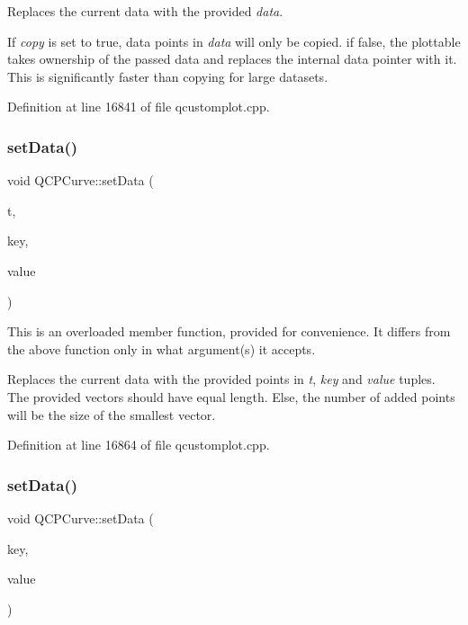 Replaces the current data with the provided {\itshape data}.

If {\itshape copy} is set to true, data points in {\itshape data} will only be copied. if false, the plottable takes ownership of the passed data and replaces the internal data pointer with it. This is significantly faster than copying for large datasets. 

Definition at line 16841 of file qcustomplot.\+cpp.

\mbox{\label{class_q_c_p_curve_affe80e011e2ced62a88f614acd6ab8d1}} 
\subsubsection{\texorpdfstring{set\+Data()}{setData()}\hspace{0.1cm}{\footnotesize\ttfamily [2/3]}}
{\footnotesize\ttfamily void Q\+C\+P\+Curve\+::set\+Data (\begin{DoxyParamCaption}\item[{const Q\+Vector$<$ double $>$ \&}]{t,  }\item[{const Q\+Vector$<$ double $>$ \&}]{key,  }\item[{const Q\+Vector$<$ double $>$ \&}]{value }\end{DoxyParamCaption})}

This is an overloaded member function, provided for convenience. It differs from the above function only in what argument(s) it accepts.

Replaces the current data with the provided points in {\itshape t}, {\itshape key} and {\itshape value} tuples. The provided vectors should have equal length. Else, the number of added points will be the size of the smallest vector. 

Definition at line 16864 of file qcustomplot.\+cpp.

\mbox{\label{class_q_c_p_curve_a963d4c45777deef15848a8f56172d066}} 
\subsubsection{\texorpdfstring{set\+Data()}{setData()}\hspace{0.1cm}{\footnotesize\ttfamily [3/3]}}
{\footnotesize\ttfamily void Q\+C\+P\+Curve\+::set\+Data (\begin{DoxyParamCaption}\item[{const Q\+Vector$<$ double $>$ \&}]{key,  }\item[{const Q\+Vector$<$ double $>$ \&}]{value }\end{DoxyParamCaption})}

